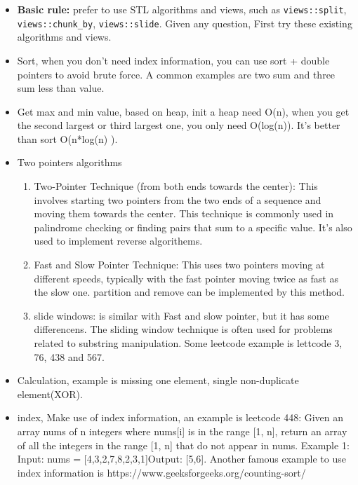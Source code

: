 \documentclass[a4paper,11pt,twoside]{book}
\begin{document}
\begin{itemize}
	\item \textbf{Basic rule:} prefer to use STL algorithms and views, such as \texttt{views::split}, \texttt{views::chunk\_by}, \texttt{views::slide}. Given any question, First try these existing algorithms and views.
	
	
	\item Sort, when you don't need index information, you can use sort + double pointers to avoid brute force. A common examples are two sum and three sum less than value. 
	
	\item Get max and min value, based on heap, init a heap need O(n), when you get the second largest or third largest one, you only need O(log(n)). It's better than sort O(n*log(n) ). 

	\item Two pointers algorithms
	\begin{enumerate}
		\item Two-Pointer Technique (from both ends towards the center): This involves starting two pointers from the two ends of a sequence and moving them towards the center. This technique is commonly used in palindrome checking or finding pairs that sum to a specific value. It's also used to implement reverse algorithems. 
		
		\item Fast and Slow Pointer Technique: This uses two pointers moving at different speeds, typically with the fast pointer moving twice as fast as the slow one. partition and remove can be implemented by this method. 
		
		\item slide windows: is similar with Fast and slow pointer, but it has some differencens. The sliding window technique is often used for problems related to substring manipulation. Some leetcode example is lettcode 3, 76, 438 and 567.
	\end{enumerate}	
	
	\item Calculation, example is missing one element, single non-duplicate element(XOR).
	
	\item index, Make use of index information, an example is leetcode 448: Given an array nums of n integers where nums[i] is in the range [1, n], return an array of all the integers in the range [1, n] that do not appear in nums. Example 1: Input: nums = [4,3,2,7,8,2,3,1]Output: [5,6]. Another famous example to use index information is  https://www.geeksforgeeks.org/counting-sort/
	

\end{itemize}
\end{document}
